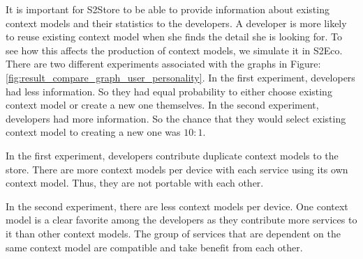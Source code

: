 It is important for S2Store to be able to provide information about existing context models and their statistics to the developers. A developer is more likely to reuse existing context model when she finds the detail she is looking for. To see how this affects the production of context models, we simulate it in S2Eco. There are two different experiments associated with the graphs in Figure: \ref{fig:result_compare_graph_user_personality}. In the first experiment, developers  had less information. So they had equal probability to either choose existing context model or create a new one themselves. In the second experiment, developers had more information. So the chance that they would select existing context model to creating a new one was $10:1$.

In the first experiment, developers contribute duplicate context models to the store. There are more context models per device with each service using its own context model. Thus, they are not portable with each other.

In the second experiment, there are less context models per device. One context model is a clear favorite among the developers as they contribute more services to it than other context models. The group of services that are dependent on the same context model are compatible and take benefit from each other.
